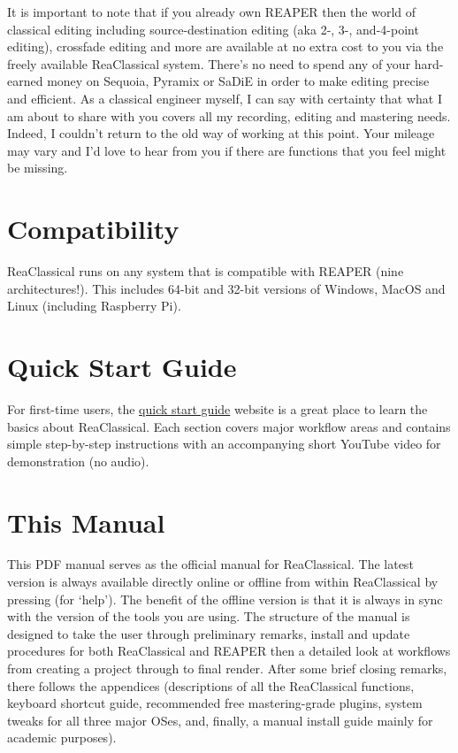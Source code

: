 \documentclass[10pt,american]{article}
\begin{document}
\noindent It is important to note that if you already own REAPER then the world
of classical editing including source-destination editing (aka 2-, 3-,
and-4-point editing), crossfade editing and more are available at no extra cost
to you via the freely available ReaClassical system. There's no need to spend
any of your hard-earned money on Sequoia, Pyramix or SaDiE in order to make
editing precise and efficient. As a classical engineer myself, I can say with
certainty that what I am about to share with you covers all my recording,
editing and mastering needs. Indeed, I couldn't return to the old way of working
at this point. Your mileage may vary and I'd love to hear from you if there are
functions that you feel might be missing. 

\section{Compatibility}

ReaClassical runs on any system that is compatible with REAPER (nine
architectures!). This includes 64-bit and 32-bit versions of Windows, MacOS and
Linux (including Raspberry Pi).

\section{Quick Start Guide}

For first-time users, the
\href{https://reaclassical.org/quick_start_guide.html}{quick start guide}
website is a great place to learn the basics about ReaClassical. Each section
covers major workflow areas and contains simple step-by-step instructions with
an accompanying short YouTube video for demonstration (no audio).

\section{This Manual}

This PDF manual serves as the official manual for ReaClassical. The latest
version is always available directly online or offline from within ReaClassical
by pressing  (for `help'). The benefit of the offline version is that it
is always in sync with the version of the tools you are using. The structure of
the manual is designed to take the user through preliminary remarks, install and
update procedures for both ReaClassical and REAPER then a detailed look at
workflows from creating a project through to final render. After some brief
closing remarks, there follows the appendices (descriptions of all the
ReaClassical functions, keyboard shortcut guide, recommended free
mastering-grade plugins, system tweaks for all three major OSes, and, finally, a
manual install guide mainly for academic purposes).
\end{document}
